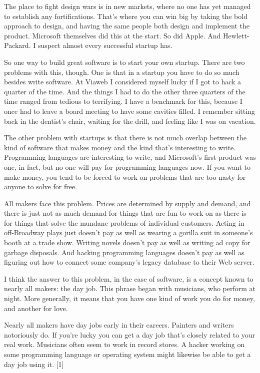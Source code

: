 The place to fight design wars is in new markets, where no one
has yet managed to establish any fortifications.  That's where
you can win big by taking the bold approach to design, and
having the same people both design and implement the product.  
Microsoft themselves did this at the start.  So did Apple.
And Hewlett-Packard.  I suspect almost every successful startup
has.



So one way to build great software is to start your own
startup.  There are two problems with this, though.  One is
that in a startup you have to do so much besides write software.
At Viaweb I considered myself lucky if I
got to hack a quarter of the time.  And the things I had to   
do the other three quarters of the time ranged from tedious
to terrifying.  I have a benchmark for this, because I
once had to leave a board meeting to have
some cavities filled.  I remember sitting back in the
dentist's chair, waiting for the drill, and feeling like
I was on vacation.

The other problem with startups is that there is not much
overlap between the kind of software that makes money and the
kind that's interesting to write.  Programming languages
are interesting to write, and Microsoft's first product was
one, in fact, but no one will pay for programming languages
now.  If you want to make money, you tend to be forced to work
on problems that are too nasty for anyone to solve for free.

All makers face this problem.  Prices are
determined by supply and demand, and there is just not as much
demand for things that are fun to work on as there is for
things that solve the mundane problems of individual customers.
Acting in off-Broadway plays just doesn't pay as well as
wearing a gorilla suit in someone's booth at a
trade show.  Writing novels doesn't pay as well as writing
ad copy for garbage disposals.
And hacking programming languages doesn't pay as well
as figuring out how to connect some company's
legacy database to their Web server.



I think the answer to this problem, in the case of software,
is a concept known to nearly all makers: the day job.
This phrase began with musicians, who
perform at night.  More generally, it means that you have one
kind of work you do for money, and another for love.

Nearly all makers have day jobs early in their careers.
Painters and writers notoriously do.  If you're lucky
you can get a day job that's closely
related to your real work.  Musicians often
seem to work in record stores.  A hacker working on some
programming language or operating system might likewise be able to
get a day job using it.  [1]

